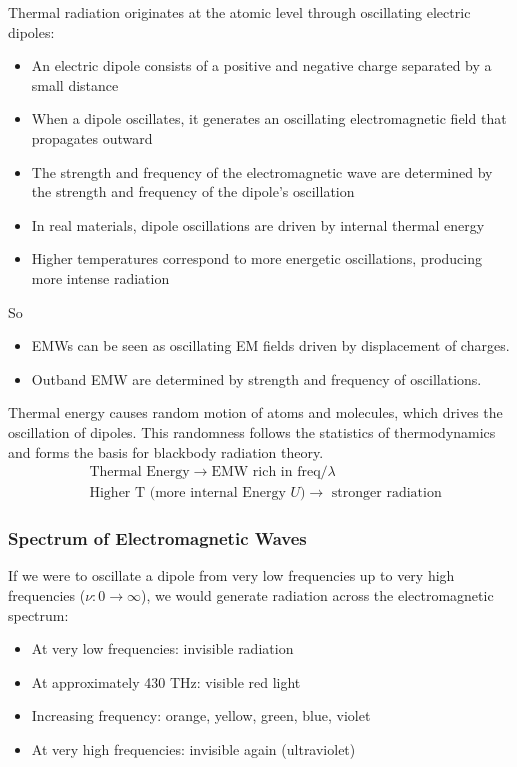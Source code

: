 Thermal radiation originates at the atomic level through oscillating electric dipoles:

\begin{itemize}
    \item An electric dipole consists of a positive and negative charge separated by a small distance
    \item When a dipole oscillates, it generates an oscillating electromagnetic field that propagates outward
    \item The strength and frequency of the electromagnetic wave are determined by the strength and frequency of the dipole's oscillation
    \item In real materials, dipole oscillations are driven by internal thermal energy
    \item Higher temperatures correspond to more energetic oscillations, producing more intense radiation
\end{itemize}
%
So
\begin{itemize}
    \item EMWs can be seen as oscillating EM fields driven by displacement of charges.
    \item Outband EMW are determined by strength and frequency of oscillations.
\end{itemize}
%
Thermal energy causes random motion of atoms and molecules, which drives the oscillation of dipoles. This randomness follows the statistics of thermodynamics and forms the basis for blackbody radiation theory.
\[  
    \begin{aligned}
        & \text{Thermal Energy} \rightarrow \text{EMW rich in freq/$\lambda $}
        \\
        &\text{Higher T (more internal Energy $U$)} \rightarrow \text{ stronger radiation} 
    \end{aligned}
\]

\subsubsection*{Spectrum of Electromagnetic Waves}

If we were to oscillate a dipole from very low frequencies up to very high frequencies ($\nu:0 \to \infty$), we would generate radiation across the electromagnetic spectrum:

\begin{itemize}
    \item At very low frequencies: invisible radiation
    \item At approximately 430 THz: visible red light
    \item Increasing frequency: orange, yellow, green, blue, violet
    \item At very high frequencies: invisible again (ultraviolet)
\end{itemize}


